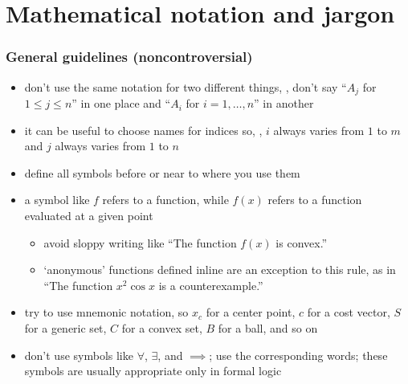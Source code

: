 \documentclass[usepdftitle=false]{beamer}
\begin{document}
\section{Mathematical notation and jargon}
\begin{frame}
    \frametitle{General guidelines (noncontroversial)}

    \begin{itemize}\itemsep=10pt
        \item don't use the same notation for two different things, \eg, don't say ``$A_j$ for $1 \leq j \leq n$'' in one place and ``$A_i$ for $i=1,\ldots,n$'' in another
        \item it can be useful to choose names for indices so, \eg, $i$ always varies from $1$ to $m$ and $j$ always varies from $1$ to $n$
        \item define all symbols before or near to where you use them
        \item a symbol like $f$ refers to a function, while $f(x)$ refers to a function evaluated at a given point
            \begin{itemize}
                \item avoid sloppy writing like ``The function $f(x)$ is convex.''
                \item `anonymous' functions defined inline are an exception to this rule, as in ``The function $x^2 \cos x$ is a counterexample.''
            \end{itemize}
        \item try to use mnemonic notation, so $x_c$ for a center point, $c$ for a cost vector, $S$ for a generic set, $C$ for a convex set, $B$ for a ball, and so on
        \item don't use symbols like $\forall$, $\exists$, and $\implies$; use the corresponding words; these symbols are usually appropriate only in formal logic
    \end{itemize}
\end{frame}
\end{document}
